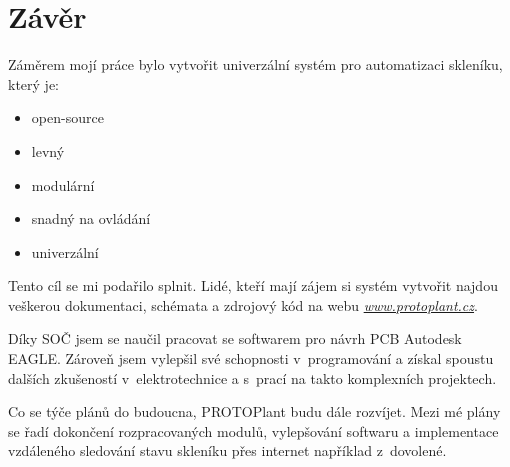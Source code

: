 \chapter*{Závěr}

Záměrem mojí práce bylo vytvořit univerzální systém pro automatizaci skle\-ní\-ku, který je:
\begin{itemize}
    \item open-source
    \item levný
    \item modulární
    \item snadný na ovládání
    \item univerzální
\end{itemize}

Tento cíl se mi podařilo splnit.
Lidé, kteří mají zájem si systém vytvořit najdou veškerou dokumentaci, schémata a zdrojový kód na webu \textit{\url{www.protoplant.cz}}.

Díky SOČ jsem se naučil pracovat se softwarem pro návrh PCB Autodesk EAGLE.
Zároveň jsem vylepšil své schopnosti v~programování a získal spoustu dalších zkušeností v~elektrotechnice a s~prací na takto komplexních projektech.

Co se týče plánů do budoucna, PROTOPlant budu dále rozvíjet.
Mezi mé plány se řadí dokončení rozpracovaných modulů, vylepšování softwaru a implementace vzdáleného sledování stavu skleníku přes internet například z~dovolené.

\fxnote[author=PŠ]{\textcolor{mygreen}{Přidat kecy o prodeji PROTOPlantu}}

\newpage
